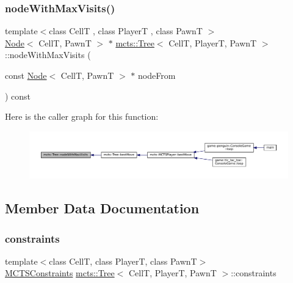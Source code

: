 \subsubsection{\texorpdfstring{node\+With\+Max\+Visits()}{nodeWithMaxVisits()}}
{\footnotesize\ttfamily template$<$class CellT , class PlayerT , class PawnT $>$ \\
\hyperlink{structmcts_1_1_node}{Node}$<$ CellT, PawnT $>$ $\ast$ \hyperlink{classmcts_1_1_tree}{mcts\+::\+Tree}$<$ CellT, PlayerT, PawnT $>$\+::node\+With\+Max\+Visits (\begin{DoxyParamCaption}\item[{const \hyperlink{structmcts_1_1_node}{Node}$<$ CellT, PawnT $>$ $\ast$}]{node\+From }\end{DoxyParamCaption}) const\hspace{0.3cm}{\ttfamily [protected]}}

Here is the caller graph for this function\+:
\nopagebreak
\begin{figure}[H]
\begin{center}
\leavevmode
\includegraphics[width=350pt]{classmcts_1_1_tree_a2cf4616df96cb68014ebd8fa6d0aebc4_icgraph}
\end{center}
\end{figure}


\subsection{Member Data Documentation}
\mbox{\label{classmcts_1_1_tree_a3abe0cefe48df8d8ee080458497d8969}} 
\subsubsection{\texorpdfstring{constraints}{constraints}}
{\footnotesize\ttfamily template$<$class CellT, class PlayerT, class PawnT$>$ \\
\hyperlink{structmcts_1_1_m_c_t_s_constraints}{M\+C\+T\+S\+Constraints} \hyperlink{classmcts_1_1_tree}{mcts\+::\+Tree}$<$ CellT, PlayerT, PawnT $>$\+::constraints}


